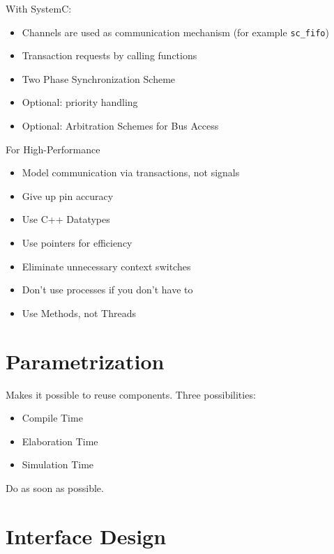 With SystemC:
\begin{itemize}
    \item Channels are used as communication mechanism (for example \lstinline{sc_fifo})
    \item Transaction requests by calling functions
    \item Two Phase Synchronization Scheme
    \item Optional: priority handling
    \item Optional: Arbitration Schemes for Bus Access
\end{itemize}

For High-Performance
\begin{itemize}
    \item Model communication via transactions, not signals
    \item Give up pin accuracy
    \item Use C++ Datatypes
    \item Use pointers for efficiency
    \item Eliminate unnecessary context switches
    \item Don't use processes if you don't have to
    \item Use Methods, not Threads
\end{itemize}

\section{Parametrization}
Makes it possible to reuse components. Three possibilities:
\begin{itemize}
    \item Compile Time
    \item Elaboration Time
    \item Simulation Time
\end{itemize}
Do as soon as possible.

\section{Interface Design}
